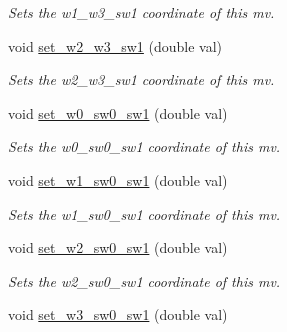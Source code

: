 \begin{DoxyCompactItemize}
\begin{DoxyCompactList}\small\item\em Sets the w1\-\_\-w3\-\_\-sw1 coordinate of this mv. \end{DoxyCompactList}\item 
\hypertarget{classe3ga_1_1mv_a6b35f85b1c710d9818959fa7969b19f9}{void \hyperlink{classe3ga_1_1mv_a6b35f85b1c710d9818959fa7969b19f9}{set\-\_\-w2\-\_\-w3\-\_\-sw1} (double val)}\label{classe3ga_1_1mv_a6b35f85b1c710d9818959fa7969b19f9}

\begin{DoxyCompactList}\small\item\em Sets the w2\-\_\-w3\-\_\-sw1 coordinate of this mv. \end{DoxyCompactList}\item 
\hypertarget{classe3ga_1_1mv_aabf5e92f3e869dda0f38a1bb2d088af6}{void \hyperlink{classe3ga_1_1mv_aabf5e92f3e869dda0f38a1bb2d088af6}{set\-\_\-w0\-\_\-sw0\-\_\-sw1} (double val)}\label{classe3ga_1_1mv_aabf5e92f3e869dda0f38a1bb2d088af6}

\begin{DoxyCompactList}\small\item\em Sets the w0\-\_\-sw0\-\_\-sw1 coordinate of this mv. \end{DoxyCompactList}\item 
\hypertarget{classe3ga_1_1mv_a40c462177992bf83106fe368404adef1}{void \hyperlink{classe3ga_1_1mv_a40c462177992bf83106fe368404adef1}{set\-\_\-w1\-\_\-sw0\-\_\-sw1} (double val)}\label{classe3ga_1_1mv_a40c462177992bf83106fe368404adef1}

\begin{DoxyCompactList}\small\item\em Sets the w1\-\_\-sw0\-\_\-sw1 coordinate of this mv. \end{DoxyCompactList}\item 
\hypertarget{classe3ga_1_1mv_aba472cb83a7f9e42591870f556633513}{void \hyperlink{classe3ga_1_1mv_aba472cb83a7f9e42591870f556633513}{set\-\_\-w2\-\_\-sw0\-\_\-sw1} (double val)}\label{classe3ga_1_1mv_aba472cb83a7f9e42591870f556633513}

\begin{DoxyCompactList}\small\item\em Sets the w2\-\_\-sw0\-\_\-sw1 coordinate of this mv. \end{DoxyCompactList}\item 
\hypertarget{classe3ga_1_1mv_a03723e8f2db4d89cf2fc5069f6f08c4f}{void \hyperlink{classe3ga_1_1mv_a03723e8f2db4d89cf2fc5069f6f08c4f}{set\-\_\-w3\-\_\-sw0\-\_\-sw1} (double val)}\label{classe3ga_1_1mv_a03723e8f2db4d89cf2fc5069f6f08c4f}


\end{DoxyCompactItemize}
